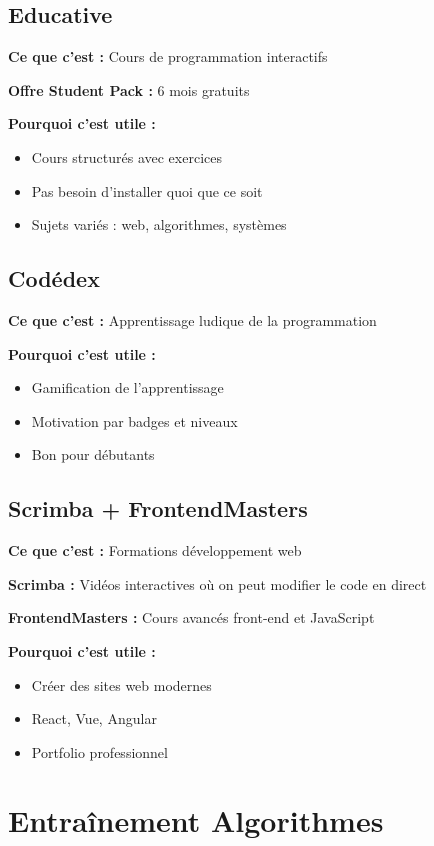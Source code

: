 \documentclass[11pt,a4paper]{article}
\begin{document}
\subsection{Educative}

\textbf{Ce que c'est :} Cours de programmation interactifs

\textbf{Offre Student Pack :} 6 mois gratuits

\textbf{Pourquoi c'est utile :}
\begin{itemize}
    \item Cours structurés avec exercices
    \item Pas besoin d'installer quoi que ce soit
    \item Sujets variés : web, algorithmes, systèmes
\end{itemize}

\subsection{Codédex}

\textbf{Ce que c'est :} Apprentissage ludique de la programmation

\textbf{Pourquoi c'est utile :}
\begin{itemize}
    \item Gamification de l'apprentissage
    \item Motivation par badges et niveaux
    \item Bon pour débutants
\end{itemize}

\subsection{Scrimba + FrontendMasters}

\textbf{Ce que c'est :} Formations développement web

\textbf{Scrimba :} Vidéos interactives où on peut modifier le code en direct

\textbf{FrontendMasters :} Cours avancés front-end et JavaScript

\textbf{Pourquoi c'est utile :}
\begin{itemize}
    \item Créer des sites web modernes
    \item React, Vue, Angular
    \item Portfolio professionnel
\end{itemize}

\newpage
\section{Entraînement Algorithmes}
\end{document}
